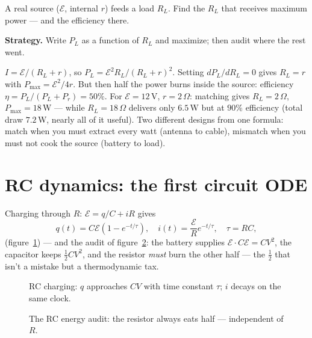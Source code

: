 \begin{example}\label{ex:maxpower}
A real source ($\mathcal E$, internal $r$) feeds a load $R_L$. Find
the $R_L$ that receives maximum power --- and the efficiency there.
\par\smallskip
\textbf{Strategy.} Write $P_L$ as a function of $R_L$ and maximize;
then audit where the rest went.
\begin{solution}
$I=\mathcal E/(R_L+r)$, so
$P_L=\mathcal E^{2}R_L/(R_L+r)^{2}$. Setting $dP_L/dR_L=0$ gives
$R_L=r$ with $P_{\max}=\mathcal E^{2}/4r$. But then half the power
burns inside the source: efficiency $\eta=P_L/(P_L+P_r)=50\%$.
For $\mathcal E=12$\,V, $r=2\,\Omega$: matching gives $R_L=2\,\Omega$,
$P_{\max}=18$\,W --- while $R_L=18\,\Omega$ delivers only $6.5$\,W
but at $90\%$ efficiency (total draw $7.2$\,W, nearly all of it
useful). Two different designs from one formula:
match when you must extract every watt (antenna to cable), mismatch
when you must not cook the source (battery to load). \checkmark
\end{solution}
\end{example}

\section{RC dynamics: the first circuit ODE}\label{sec:cir-rc}

Charging through $R$: $\mathcal E=q/C+iR$ gives
\begin{equation}
  q(t)=C\mathcal E\left(1-e^{-t/\tau}\right),\quad
  i(t)=\frac{\mathcal E}{R}e^{-t/\tau},\quad \tau=RC,
  \label{eq:rc}
\end{equation}
(figure~\ref{fig:rc}) --- and the audit of figure~\ref{fig:audit}:
the battery supplies $\mathcal E\cdot C\mathcal E=CV^{2}$, the capacitor
keeps $\tfrac12CV^{2}$, and the resistor \emph{must} burn the other half
--- the $\tfrac12$ that isn't a mistake but a thermodynamic tax.

\begin{figure}[htbp]\centering

\caption{RC charging: $q$ approaches $CV$ with time constant $\tau$;
$i$ decays on the same clock.}
\label{fig:rc}
\end{figure}

\begin{figure}[htbp]\centering

\caption{The RC energy audit: the resistor always eats half ---
independent of $R$.}
\label{fig:audit}
\end{figure}

